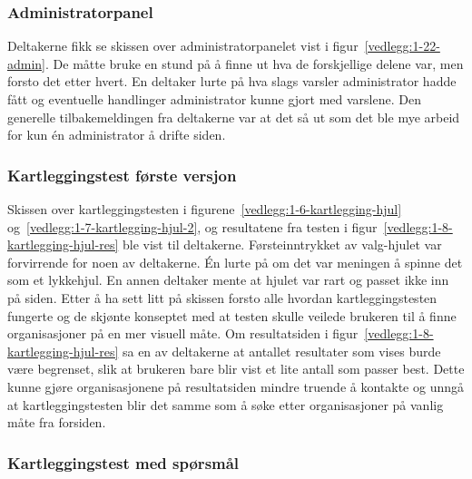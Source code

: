 \subsubsection{Administratorpanel}

Deltakerne fikk se skissen over administratorpanelet vist i figur~\ref{vedlegg:1-22-admin}. De måtte bruke en stund på å finne ut hva de forskjellige delene var, men forsto det etter hvert. En deltaker lurte på hva slags varsler administrator hadde fått og eventuelle handlinger administrator kunne gjort med varslene. Den generelle tilbakemeldingen fra deltakerne var at det så ut som det ble mye arbeid for kun én administrator å drifte siden.


\subsubsection{Kartleggingstest første versjon}
\label{section:test-kartlegging-hjul1.0}

Skissen over kartleggingstesten i figurene~\ref{vedlegg:1-6-kartlegging-hjul} og~\ref{vedlegg:1-7-kartlegging-hjul-2}, og resultatene fra testen i figur~\ref{vedlegg:1-8-kartlegging-hjul-res} ble vist til deltakerne. Førsteinntrykket av valg-hjulet var forvirrende for noen av deltakerne. Én lurte på om det var meningen å spinne det som et lykkehjul. En annen deltaker mente at hjulet var rart og passet ikke inn på siden. Etter å ha sett litt på skissen forsto alle hvordan kartleggingstesten fungerte og de skjønte konseptet med at testen skulle veilede brukeren til å finne organisasjoner på en mer visuell måte. Om resultatsiden i figur~\ref{vedlegg:1-8-kartlegging-hjul-res} sa en av deltakerne at antallet resultater som vises burde være begrenset, slik at brukeren bare blir vist et lite antall som passer best. Dette kunne gjøre organisasjonene på resultatsiden mindre truende å kontakte og unngå at kartleggingstesten blir det samme som å søke etter organisasjoner på vanlig måte fra forsiden.


\subsubsection{Kartleggingstest med spørsmål}
\label{section:test-kartlegging-spm1.0}

